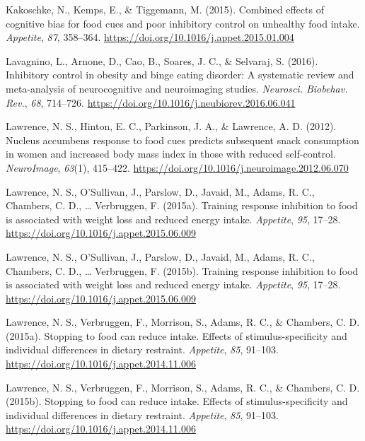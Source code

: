\documentclass[man,floatsintext]{apa6}
\begin{document}
\hypertarget{ref-kakoschke_combined_2015-1}{}
Kakoschke, N., Kemps, E., \& Tiggemann, M. (2015). Combined effects of
cognitive bias for food cues and poor inhibitory control on unhealthy
food intake. \emph{Appetite}, \emph{87}, 358--364.
\url{https://doi.org/10.1016/j.appet.2015.01.004}

\hypertarget{ref-lavagnino_inhibitory_2016}{}
Lavagnino, L., Arnone, D., Cao, B., Soares, J. C., \& Selvaraj, S.
(2016). Inhibitory control in obesity and binge eating disorder: A
systematic review and meta-analysis of neurocognitive and neuroimaging
studies. \emph{Neurosci. Biobehav. Rev.}, \emph{68}, 714--726.
\url{https://doi.org/10.1016/j.neubiorev.2016.06.041}

\hypertarget{ref-lawrence_nucleus_2012-1}{}
Lawrence, N. S., Hinton, E. C., Parkinson, J. A., \& Lawrence, A. D.
(2012). Nucleus accumbens response to food cues predicts subsequent
snack consumption in women and increased body mass index in those with
reduced self-control. \emph{NeuroImage}, \emph{63}(1), 415--422.
\url{https://doi.org/10.1016/j.neuroimage.2012.06.070}

\hypertarget{ref-lawrence_training_2015}{}
Lawrence, N. S., O'Sullivan, J., Parslow, D., Javaid, M., Adams, R. C.,
Chambers, C. D., \ldots{} Verbruggen, F. (2015a). Training response
inhibition to food is associated with weight loss and reduced energy
intake. \emph{Appetite}, \emph{95}, 17--28.
\url{https://doi.org/10.1016/j.appet.2015.06.009}

\hypertarget{ref-lawrenceTrainingResponseInhibition2015}{}
Lawrence, N. S., O'Sullivan, J., Parslow, D., Javaid, M., Adams, R. C.,
Chambers, C. D., \ldots{} Verbruggen, F. (2015b). Training response
inhibition to food is associated with weight loss and reduced energy
intake. \emph{Appetite}, \emph{95}, 17--28.
\url{https://doi.org/10.1016/j.appet.2015.06.009}

\hypertarget{ref-lawrence_stopping_2015-3}{}
Lawrence, N. S., Verbruggen, F., Morrison, S., Adams, R. C., \&
Chambers, C. D. (2015a). Stopping to food can reduce intake. Effects of
stimulus-specificity and individual differences in dietary restraint.
\emph{Appetite}, \emph{85}, 91--103.
\url{https://doi.org/10.1016/j.appet.2014.11.006}

\hypertarget{ref-lawrence_stopping_2015}{}
Lawrence, N. S., Verbruggen, F., Morrison, S., Adams, R. C., \&
Chambers, C. D. (2015b). Stopping to food can reduce intake. Effects of
stimulus-specificity and individual differences in dietary restraint.
\emph{Appetite}, \emph{85}, 91--103.
\url{https://doi.org/10.1016/j.appet.2014.11.006}
\end{document}
